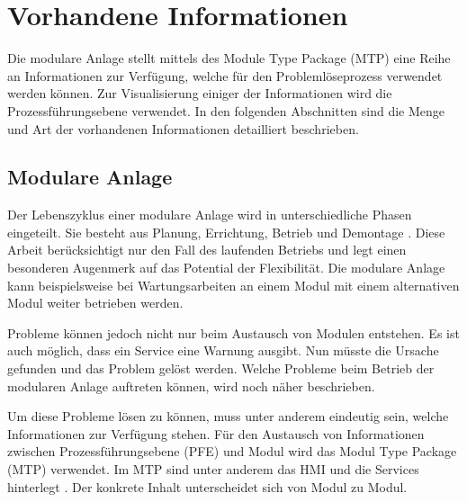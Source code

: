 \section{Vorhandene Informationen}
Die modulare Anlage stellt mittels des Module Type Package (MTP) eine Reihe an Informationen zur Verfügung, welche für den Problemlöseprozess verwendet werden können. Zur Visualisierung einiger der Informationen wird die Prozessführungsebene verwendet. In den folgenden Abschnitten sind die Menge und Art der vorhandenen Informationen detailliert beschrieben. 

\subsection{Modulare Anlage}
Der Lebenszyklus einer modulare Anlage wird in unterschiedliche Phasen eingeteilt. Sie besteht aus Planung, Errichtung, Betrieb und Demontage \cite{Obst2013}. Diese Arbeit berücksichtigt nur den Fall des laufenden Betriebs und legt einen besonderen Augenmerk auf das Potential der Flexibilität. Die modulare Anlage kann beispielsweise bei Wartungsarbeiten an einem Modul mit einem alternativen Modul weiter betrieben werden.

Probleme können jedoch nicht nur beim Austausch von Modulen entstehen. Es ist auch möglich, dass ein Service eine Warnung ausgibt. Nun müsste die Ursache gefunden und das Problem gelöst werden. Welche Probleme beim Betrieb der modularen Anlage auftreten können, wird noch näher beschrieben.

Um diese Probleme lösen zu können, muss unter anderem eindeutig sein, welche Informationen zur Verfügung stehen. Für den Austausch von Informationen zwischen Prozessführungsebene (PFE) und Modul wird das Modul Type Package (MTP) verwendet. Im MTP sind unter anderem das HMI und die Services hinterlegt \cite{VDI2658-Blatt1}. Der konkrete Inhalt unterscheidet sich von Modul zu Modul.

